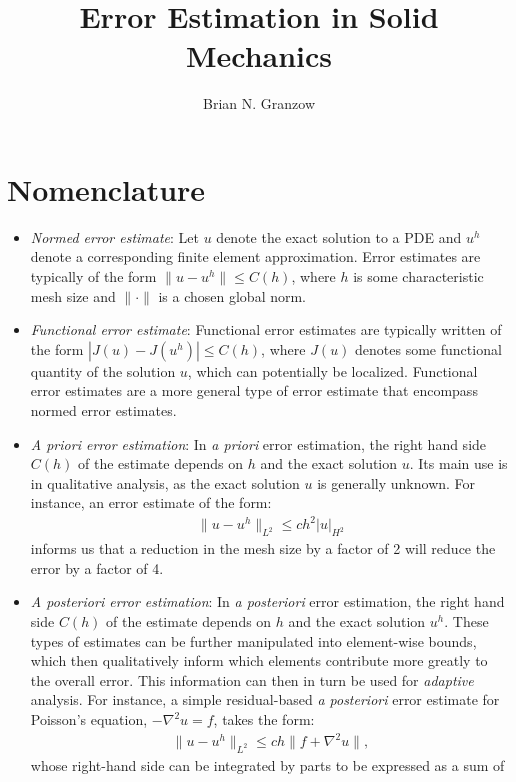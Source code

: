 \documentclass{article}
\title{Error Estimation in Solid Mechanics}
\author{Brian N. Granzow}
\begin{document}
\maketitle

\section{Nomenclature}

\begin{itemize}
\item \emph{Normed error estimate}: Let $u$ denote the exact solution to a
PDE and $u^h$ denote a corresponding finite element approximation.
Error estimates are typically of the form $\| u - u^h \| \leq C(h)$,
where $h$ is some characteristic mesh size and $\| \cdot \|$ is a
chosen global norm.
\item \emph{Functional error estimate}: Functional error estimates
are typically written of the form $| J(u) - J(u^h) | \leq C(h)$,
where $J(u)$ denotes some functional quantity of the solution $u$, which
can potentially be localized. Functional error estimates are a more
general type of error estimate that encompass normed error estimates.
\item \emph{A priori error estimation}: In \emph{a priori} error estimation,
the right hand side $C(h)$ of the estimate depends on $h$ and the
exact solution $u$. Its main use is in qualitative analysis, as the exact
solution $u$ is generally unknown. For instance, an error estimate of the
form:
\begin{gather}
\| u - u^h \| _{L^2} \leq ch^2 | u |_{H^2}
\end{gather}
informs us that a reduction in the mesh size by a factor of 2 will reduce
the error by a factor of 4.
\item \emph{A posteriori error estimation}: In \emph{a posteriori} error
estimation, the right hand side $C(h)$ of the estimate depends on $h$
and the exact solution $u^h$. These types of estimates can be further
manipulated into element-wise bounds, which then qualitatively inform
which elements contribute more greatly to the overall error. This information
can then in turn be used for \emph{adaptive} analysis. For instance,
a simple residual-based \emph{a posteriori} error estimate for Poisson's
equation, $- \nabla^2 u = f$, takes the form:
\begin{gather}
\| u - u^h \| _{L^2} \leq c h \| f + \nabla^2u \|,
\end{gather}
whose right-hand side can be integrated by parts to be expressed as a sum of

\end{itemize}
\end{document}
